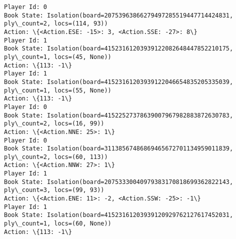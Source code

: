 \documentclass[11pt]{article}
\begin{document}
\begin{Verbatim}[commandchars=\\\{\}]
Player Id: 0
Book State: Isolation(board=20753963866279497285519447714424831, ply\_count=2, locs=(114, 93))
Action: \{<Action.ESE: -15>: 3, <Action.SSE: -27>: 8\}
Player Id: 1
Book State: Isolation(board=41523161203939122082648447852210175, ply\_count=1, locs=(45, None))
Action: \{113: -1\}
Player Id: 1
Book State: Isolation(board=41523161203939122046654835205335039, ply\_count=1, locs=(55, None))
Action: \{113: -1\}
Player Id: 0
Book State: Isolation(board=41522527378639007967982883872630783, ply\_count=2, locs=(16, 99))
Action: \{<Action.NNE: 25>: 1\}
Player Id: 0
Book State: Isolation(board=31138567486869465672701134959011839, ply\_count=2, locs=(60, 113))
Action: \{<Action.NNW: 27>: 1\}
Player Id: 1
Book State: Isolation(board=20753330040979383170818699362822143, ply\_count=3, locs=(99, 93))
Action: \{<Action.ENE: 11>: -2, <Action.SSW: -25>: -1\}
Player Id: 1
Book State: Isolation(board=41523161203939120929762127617452031, ply\_count=1, locs=(60, None))
Action: \{113: -1\}


\end{Verbatim}
\end{document}
